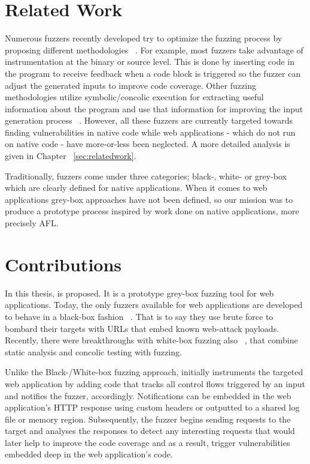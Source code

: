 \section{Related Work}
Numerous fuzzers recently developed try to optimize the fuzzing process by proposing different methodologies ~\cite{godefroid2012sage, stephens2016driller, rawat2017vuzzer, aschermann2019nautilus, aschermann2019redqueen, hoffman2020Was, osterlund2020parmesan}. 
For example, most fuzzers take advantage of instrumentation at the binary or source level. This is done by inserting code in the program to receive feedback when a code block is
triggered so the fuzzer can adjust the generated inputs to improve code coverage. 
Other fuzzing methodologies utilize symbolic/concolic execution for extracting useful information about the program and use that information for improving the input generation process ~\cite{Godefroid2008AutomatedWF,stephens2016driller,godefroid2005dart,godefroid2012sage}. However, all these fuzzers are currently targeted towards finding vulnerabilities in native code while web applications - which do not run on native code - have more-or-less been neglected. A more detailed analysis is given in Chapter ~\ref{sec:relatedwork}.

Traditionally, fuzzers come under three categories; black-, white- or grey-box which are clearly defined for native applications. When it comes to web applications grey-box approaches have not been defined, so our mission was to produce a prototype process inspired by work done on native applications, more precisely AFL.

\section{Contributions}
In this thesis, \pname{} is proposed. It is a prototype grey-box fuzzing tool for web applications. Today, the only fuzzers available for web applications are developed to behave in a black-box fashion ~\cite{doupe2010johnny}. That is to say they use brute force to bombard their targets with URLs that embed known web-attack payloads. Recently, there were breakthroughs with white-box fuzzing also ~\cite{navex2018,Borges2018BaZINGAWF}, that combine static analysis and concolic testing with fuzzing.

Unlike the Black-/White-box fuzzing approach, \pname{} initially instruments the targeted web application by adding code that tracks all control flows triggered by an input and notifies the fuzzer, accordingly. Notifications can be embedded in the web application's HTTP response using custom headers or outputted to a shared log file or memory region. Subsequently, the fuzzer begins sending requests to the target and analyses the responses to detect any interesting requests that would later help to improve the code coverage and as a result, trigger vulnerabilities embedded deep in the web application's code.

